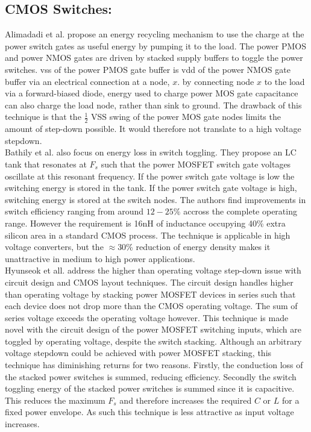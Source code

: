 \documentclass[letterpaper,twocolumn,10pt]{article}
\begin{document}
\subsection{CMOS Switches: }Alimadadi et al.\cite{Alimadadi2008} propose an energy recycling mechanism to use the charge at the power switch gates as useful energy by pumping it to the load. The power PMOS and power NMOS gates are driven by stacked supply buffers to toggle the power switches. vss of the power PMOS gate buffer is vdd of the power NMOS gate buffer via an electrical connection at a node, $x$. by connecting node $x$ to the load via a forward-biased diode, energy used to charge power MOS gate capacitance can also charge the load node, rather than sink to ground. The drawback of this technique is that the $\frac{1}{2}$ VSS swing of the power MOS gate nodes limits the amount of step-down possible. It would therefore not translate to a high voltage stepdown.\\
\indent Bathily et al.\cite{Bathily2012} also focus on energy loss in switch toggling. They propose an LC tank that resonates at $F_s$ such that the power MOSFET switch gate voltages oscillate at this resonant frequency. If the power switch gate voltage is low the switching energy is stored in the tank. If the power switch gate voltage is high, switching energy is stored at the switch nodes. The authors find improvements in switch efficiency ranging from around $12 - 25\%$ accross the complete operating range. However the requirement is 16nH of inductance occupying 40\% extra silicon area in a standard CMOS process. The technique is applicable in high voltage converters, but the $\approx$30\% reduction of energy density makes it unattractive in medium to high power applications.\\
\indent Hyunseok et all.\cite{Hyunseok2012} address the higher than operating voltage step-down issue with circuit design and CMOS layout techniques. The circuit design handles higher than operating voltage by stacking power MOSFET devices in series such that each device does not drop more than the CMOS operating voltage. The sum of series voltage exceeds the operating voltage however. This technique is made novel with the circuit design of the power MOSFET switching inputs, which are toggled by operating voltage, despite the switch stacking. Although an arbitrary voltage stepdown could be achieved with power MOSFET stacking, this technique has diminishing returns for two reasons. Firstly, the conduction loss of the stacked power switches is summed, reducing efficiency. Secondly the switch toggling energy of the stacked power switches is summed since it is capacitive. This reduces the maximum $F_s$ and therefore increases the required $C$ or $L$ for a fixed power envelope. As such this technique is less attractive as input voltage increases.\\
\end{document}

